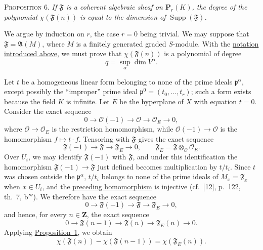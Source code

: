 \label{fac:III:6:no:81:prop:6}
\textsc{Proposition 6.} \textit{If $\mathfrak F$ is a coherent
algebraic sheaf on $\mathbf P_r(K)$, the degree of the polynomial
$\chi(\mathfrak F(n))$ is equal to the dimension of
$\operatorname{Supp}(\mathfrak F)$.}

\label{fac:III:6:no:81:prop:6:proof}
We argue by induction on $r$, the case $r=0$ being trivial. We may
suppose that $\mathfrak F=\mathfrak A(M)$, where $M$ is a finitely
generated graded $S$-module. With the
\hyperref[fac:III:6:no:81:primary-decomposition]{notation introduced above}, we
must prove that $\chi(\mathfrak F(n))$ is a polynomial of degree
\label{fac:III:6:no:81:formula:q}
\[
q=\sup_\alpha\dim V^\alpha.
\]

Let $t$ be a homogeneous linear form belonging to none of the prime
ideals $\mathfrak p^\alpha$, except possibly the ``improper'' prime
ideal $\mathfrak p^0=(t_0,\ldots,t_r)$; such a form exists because the
field $K$ is infinite. Let $E$ be the hyperplane of $X$ with equation
$t=0$. Consider the exact sequence
\label{fac:III:6:no:81:sequence:hyperplane}
\[
0\longrightarrow\mathcal O(-1)\longrightarrow\mathcal O
\longrightarrow\mathcal O_E\longrightarrow0,
\]
where $\mathcal O\to\mathcal O_E$ is the restriction homomorphism,
while $\mathcal O(-1)\to\mathcal O$ is the homomorphism
$f\mapsto t\cdot f$. Tensoring with $\mathfrak F$ gives the exact
sequence
\label{fac:III:6:no:81:sequence:tensored}
\[
\mathfrak F(-1)\longrightarrow\mathfrak F
\longrightarrow\mathfrak F_E\longrightarrow0,
\qquad
\mathfrak F_E=\mathfrak F\otimes_{\mathcal O}\mathcal O_E.
\]
Over $U_i$, we may identify $\mathfrak F(-1)$ with $\mathfrak F$, and
under this identification the homomorphism
$\mathfrak F(-1)\to\mathfrak F$ just defined becomes multiplication
by $t/t_i$. Since $t$ was chosen outside the $\mathfrak p^\alpha$,
$t/t_i$ belongs to none of the prime ideals of
$M_x=\mathfrak F_x$ when $x\in U_i$, and the
\hyperref[fac:III:6:no:81:sequence:tensored]{preceding homomorphism} is
injective (cf.~[12], p.~122, th.~7, b$'''$). We therefore have the
exact sequence
\label{fac:III:6:no:81:sequence:injective}
\[
0\longrightarrow\mathfrak F(-1)\longrightarrow\mathfrak F
\longrightarrow\mathfrak F_E\longrightarrow0,
\]
and hence, for every $n\in\mathbf Z$, the exact sequence
\label{fac:III:6:no:81:sequence:twisted}
\[
0\longrightarrow\mathfrak F(n-1)\longrightarrow\mathfrak F(n)
\longrightarrow\mathfrak F_E(n)\longrightarrow0.
\]
Applying \hyperref[fac:III:6:no:79:prop:1]{Proposition~1}, we obtain
\label{fac:III:6:no:81:formula:first-difference}
\[
\chi(\mathfrak F(n))-\chi(\mathfrak F(n-1))
=\chi(\mathfrak F_E(n)).
\]

